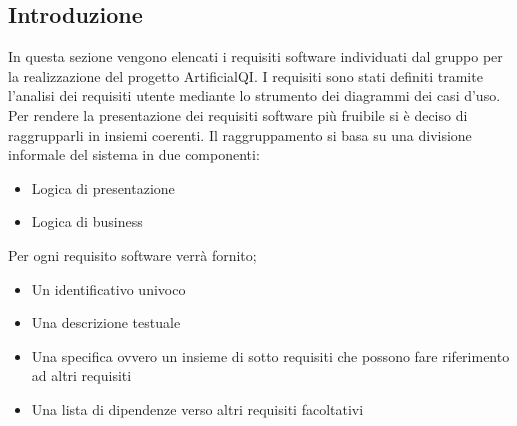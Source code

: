 
\subsection{Introduzione}
\label{sec:requisiti_software}
In questa sezione vengono elencati i requisiti software individuati dal gruppo per la realizzazione del progetto ArtificialQI.
I requisiti sono stati definiti tramite l'analisi dei requisiti utente mediante lo strumento dei diagrammi dei casi d'uso.
Per rendere la presentazione dei requisiti software più fruibile si è deciso di raggrupparli in insiemi coerenti.
Il raggruppamento si basa su una divisione informale del sistema in due componenti:
\begin{itemize}
    \item Logica di presentazione
    \item Logica di business
\end{itemize} 
Per ogni requisito software verrà fornito;
\begin{itemize}
    \item Un identificativo univoco
    \item Una descrizione testuale 
    \item Una specifica ovvero un insieme di sotto requisiti che possono fare riferimento ad altri requisiti 
    \item Una lista di dipendenze verso altri requisiti facoltativi
\end{itemize}

